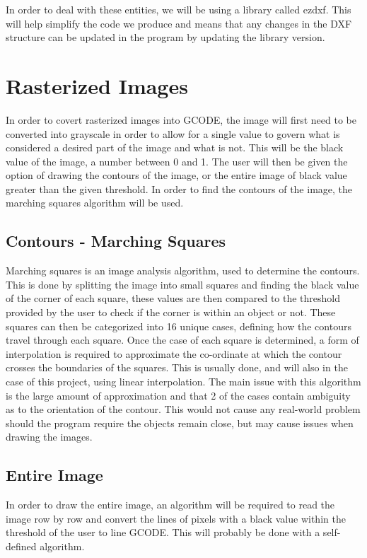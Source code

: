		In order to deal with these entities, we will be using a library called ezdxf. This will help simplify the code we produce and means that any changes in the DXF structure can be updated in the program by updating the library version.

	\section{Rasterized Images}
		\label{sec:vectorization}

		In order to covert rasterized images into GCODE, the image will first need to be converted into grayscale in order to allow for a single value to govern what is considered a desired part of the image and what is not. This will be the black value of the image, a number between 0 and 1. The user will then be given the option of drawing the contours of the image, or the entire image of black value greater than the given threshold. In order to find the contours of the image, the marching squares algorithm will be used.
		\subsection{Contours - Marching Squares}
			Marching squares is an image analysis algorithm, used to determine the contours. This is done by splitting the image into small squares and finding the black value of the corner of each square, these values are then compared to the threshold provided by the user to check if the corner is within an object or not. These squares can then be categorized into 16 unique cases, defining how the contours travel through each square. Once the case of each square is determined, a form of interpolation is required to approximate the co-ordinate at which the contour crosses the boundaries of the squares. This is usually done, and will also in the case of this project, using linear interpolation. The main issue with this algorithm is the large amount of approximation and that 2 of the cases contain ambiguity as to the orientation of the contour. This would not cause any real-world problem should the program require the objects remain close, but may cause issues when drawing the images.
		\subsection{Entire Image}
			In order to draw the entire image, an algorithm will be required to read the image row by row and convert the lines of pixels with a black value within the threshold of the user to line GCODE. This will probably be done with a self-defined algorithm.